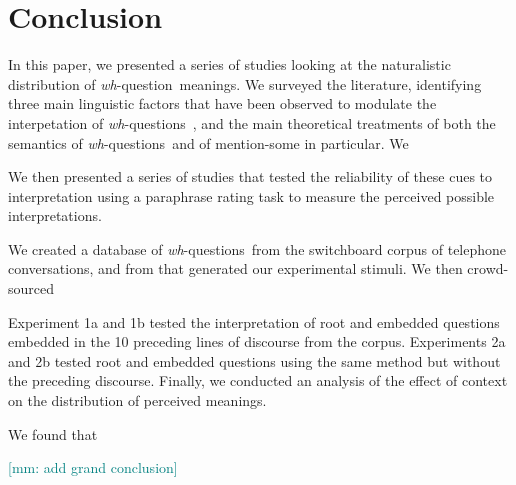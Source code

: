 \documentclass[12pt,letterpaper,table,svgnames,dvipsnames]{article}
\newcommand{\mm}[1]{\textcolor{teal}{[mm: #1]}}
\newcommand{\whq}{\emph{wh}-question~}
\newcommand{\whqs}{\emph{wh}-questions~}
\begin{document}
\section{Conclusion}

In this paper, we presented a series of studies looking at the naturalistic distribution of \whq meanings. We surveyed the literature, identifying three main linguistic factors that have been observed to modulate the interpetation of \whqs, and the main theoretical treatments of both the semantics of \whqs and of mention-some in particular. We 


We then presented a series of studies that tested the reliability of these cues to interpretation using a paraphrase rating task to measure the perceived possible interpretations. 

We created a database of \whqs from the switchboard corpus of telephone conversations, and from that generated our experimental stimuli. We then crowd-sourced 

Experiment 1a and 1b tested the interpretation of root and embedded questions embedded in the 10 preceding lines of discourse from the corpus. Experiments 2a and 2b tested root and embedded questions using the same method but without the preceding discourse. Finally, we conducted an analysis of the effect of context on the distribution of perceived meanings.

We found that 

\mm{add grand conclusion}




\setlength{\bibleftmargin}{.125in}
\setlength{\bibindent}{-\bibleftmargin}


\end{document}
